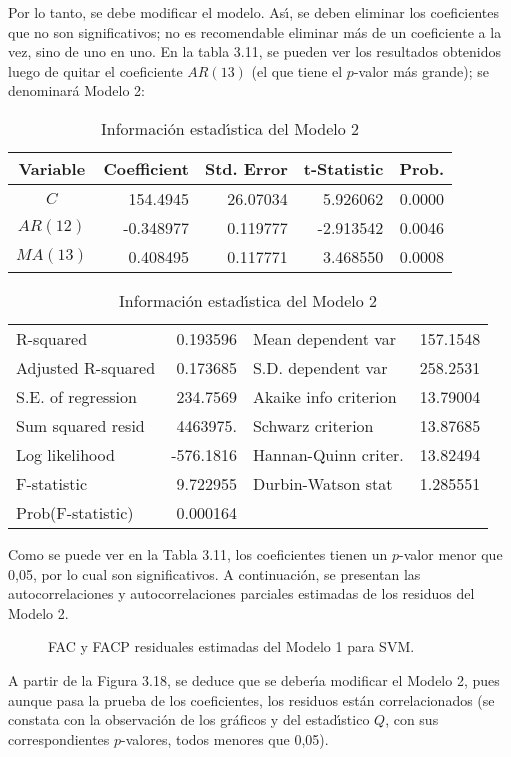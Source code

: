 Por lo tanto, se debe modificar el modelo. As\'{\i}, se deben eliminar los 
coeficientes que no son significativos; no es recomendable eliminar m\'{a}s 
de un coeficiente a la vez, sino de uno en uno. En la tabla 3.11, se pueden 
ver los resultados obtenidos luego de quitar el coeficiente $AR(13)$ (el que 
tiene el $p$-valor m\'{a}s grande); se denominar\'{a} Modelo 2:

\begin{table}[H]
\centering\small
\caption{Informaci\'{o}n estad\'{\i}stica del Modelo 2}
\begin{tabular}{@{}crrrr@{}}
\toprule
Variable& Coefficient& Std. Error& t-Statistic& Prob. \\
\midrule
$C$& 154.4945& 26.07034& 5.926062& 0.0000 \\
$AR(12)$& -0.348977& 0.119777& -2.913542& 0.0046 \\
$MA(13)$& 0.408495& 0.117771& 3.468550& 0.0008 \\
\bottomrule
\end{tabular}

\begin{tabular}{@{}lrlr@{}}
\toprule
R-squared& 0.193596& Mean dependent var & 157.1548 \\
Adjusted R-squared& 0.173685& S.D. dependent var & 258.2531 \\
S.E. of regression& 234.7569& Akaike info criterion & 13.79004 \\
Sum squared resid& 4463975.& Schwarz criterion & 13.87685 \\
Log likelihood& -576.1816& Hannan-Quinn criter. & 13.82494 \\
F-statistic& 9.722955& Durbin-Watson stat & 1.285551 \\
Prob(F-statistic)& 0.000164&  \\
\bottomrule
\end{tabular}
\end{table}


Como se puede ver en la Tabla 3.11, los coeficientes tienen un $p$-valor menor 
que 0,05, por lo cual son significativos. A continuaci\'{o}n, se presentan 
las autocorrelaciones y autocorrelaciones parciales estimadas de los 
residuos del Modelo 2.

\begin{figure}[H]
\centering
\caption{FAC y FACP residuales estimadas del Modelo 1 para SVM.}
\end{figure}

A partir de la Figura 3.18, se deduce que se deber\'{\i}a modificar el 
Modelo 2, pues aunque pasa la prueba de los coeficientes, los residuos 
est\'{a}n correlacionados (se constata con la observaci\'{o}n de los 
gr\'{a}ficos y del estad\'{\i}stico $Q$, con sus correspondientes $p$-valores, 
todos menores que 0,05).


